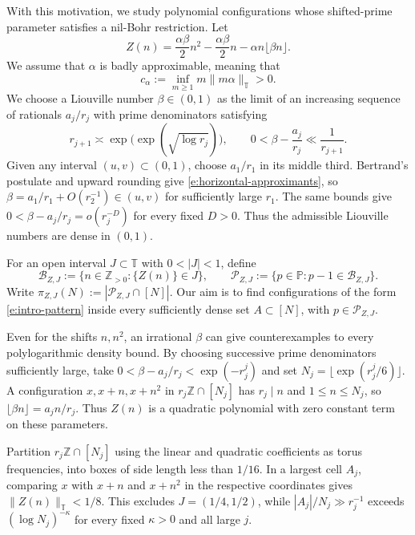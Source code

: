 \documentclass[12pt]{amsart}
\newcommand{\1}{\mathbf 1}
\theoremstyle{definition}
\begin{document}
With this motivation, we study polynomial configurations whose
shifted-prime parameter satisfies a nil-Bohr restriction. Let
\begin{equation}\label{e:heisenberg-phase}
 Z(n)=\frac{\alpha\beta}{2}n^2-\frac{\alpha\beta}{2}n
       -\alpha n\lfloor\beta n\rfloor.
\end{equation}
We assume that $\alpha$ is badly approximable, meaning that
\begin{equation}\label{e:badly-approximable}
 c_\alpha:=\inf_{m\geq1}m\|m\alpha\|_{\mathbb T}>0.
\end{equation}
We choose a Liouville number $\beta\in(0,1)$ as the limit of an increasing sequence of
rationals $a_j/r_j$ with prime denominators satisfying
\begin{equation}\label{e:horizontal-approximants}
 r_{j+1}\asymp\exp\!\bigl(\exp(\sqrt{\log r_j})\bigr),
 \qquad 0<\beta-\frac{a_j}{r_j}\ll\frac1{r_{j+1}}.
\end{equation}
Given any interval $(u,v)\subset(0,1)$, choose $a_1/r_1$ in its
middle third. Bertrand's postulate and upward rounding give
\eqref{e:horizontal-approximants}, so
$\beta=a_1/r_1+O(r_2^{-1})\in(u,v)$ for sufficiently large $r_1$.
The same bounds give $0<\beta-a_j/r_j=o(r_j^{-D})$ for every
fixed $D>0$. Thus the admissible Liouville numbers are dense
in $(0,1)$.

For an open interval $J\subset\mathbb T$ with $0<|J|<1$, define
\begin{equation}\label{e:explicit-B}
 \mathcal B_{Z,J}:=\{n\in\mathbb Z_{>0}:\{Z(n)\}\in J\},
 \qquad
 \mathcal P_{Z,J}:=\{p\in\mathbb P:p-1\in\mathcal B_{Z,J}\}.
\end{equation}
Write $\pi_{Z,J}(N):=|\mathcal P_{Z,J}\cap[N]|$.
Our aim is to find configurations of the form \eqref{e:intro-pattern} 
inside every sufficiently dense set $A\subset[N]$, with
$p\in\mathcal P_{Z,J}$.

\medskip

Even for the shifts $n,n^2$, an irrational $\beta$ can give
counterexamples to every polylogarithmic density bound. By choosing
successive prime denominators sufficiently large, take
$0<\beta-a_j/r_j<\exp(-r_j^j)$ and set
$N_j=\lfloor\exp(r_j^j/6)\rfloor$. A configuration
$x,x+n,x+n^2$ in $r_j\mathbb Z\cap[N_j]$ has $r_j\mid n$ and
$1\leq n\leq N_j$, so $\lfloor\beta n\rfloor=a_jn/r_j$.
Thus $Z(n)$ is a quadratic polynomial with zero constant term
on these parameters.

Partition $r_j\mathbb Z\cap[N_j]$ using the linear and quadratic
coefficients as torus frequencies, into boxes of side length less
than $1/16$. In a largest cell $A_j$, comparing $x$ with $x+n$
and $x+n^2$ in the respective coordinates gives
$\|Z(n)\|_{\mathbb T}<1/8$. This excludes $J=(1/4,1/2)$, while
$|A_j|/N_j\gg r_j^{-1}$ exceeds $(\log N_j)^{-\kappa}$ for
every fixed $\kappa>0$ and all large $j$.
\end{document}
